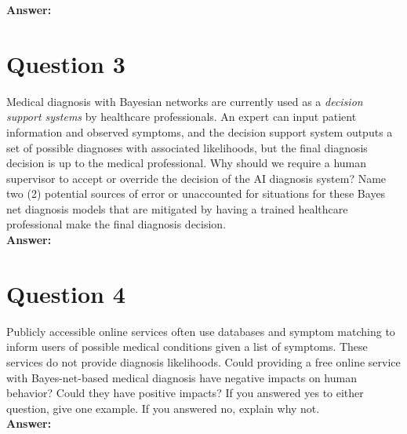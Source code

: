 \documentclass[12pt]{article}
\begin{document}
\noindent\textbf{Answer:}
\begin{center}
\end{center}
\newpage

\section*{Question 3}
Medical diagnosis with Bayesian networks are currently used as
a \textit{decision support systems} by healthcare professionals. An expert can 
input patient information and observed symptoms, and the decision support system 
outputs a set of possible diagnoses with associated likelihoods, but the final 
diagnosis decision is up to the medical professional. Why should we require a human
supervisor to accept or override the decision of the AI diagnosis system? Name two 
(2) potential sources of error or unaccounted for situations for these Bayes net 
diagnosis models that are mitigated by having a trained healthcare professional 
make the final diagnosis decision. \\

\noindent\textbf{Answer:}

\newpage

\section*{Question 4} Publicly accessible online services often use databases and 
symptom matching to inform users of possible medical conditions given a list of 
symptoms. These services do not provide diagnosis likelihoods. Could providing a 
free online service with Bayes-net-based medical diagnosis have negative impacts on
human behavior? Could they have positive impacts? If you answered yes to either 
question, give one example. If you answered no, explain why not. \\

\noindent\textbf{Answer:}
\end{document}
